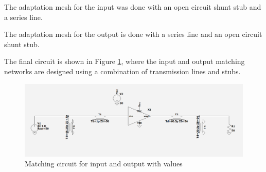 
The adaptation mesh for the input was done with an open circuit shunt stub and a series line. 


The adaptation mesh for the output is done with a series line and an open circuit shunt stub.

The final circuit is shown in Figure \ref{fig:MatchingCircuit-line}, where the input and output matching networks are designed using a combination of transmission lines and stubs.

\begin{figure}[H]
    \centering
    \includegraphics[width=1\textwidth]{Images/LS_matching-circuit.png}
    \caption{Matching circuit for input and output with values}
    \label{fig:MatchingCircuit-line}
\end{figure}

